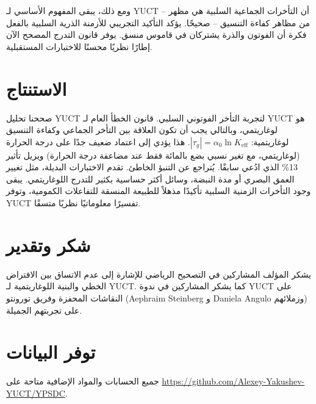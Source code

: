 \documentclass[12pt,a4paper]{article}
\newcommand{\Keff}{K_{\mathrm{eff}}}
\begin{document}
	ومع ذلك، يبقى المفهوم الأساسي لـ YUCT – أن التأخرات الجماعية السلبية هي مظهر من مظاهر كفاءة التنسيق – صحيحًا. يؤكد التأكيد التجريبي للأزمنة الذرية السلبية بالفعل فكرة أن الفوتون والذرة يشتركان في قاموس منسق. يوفر قانون التدرج المصحح الآن إطارًا نظريًا محسنًا للاختبارات المستقبلية.
	
	\section{الاستنتاج}
	
	صححنا تحليل YUCT لتجربة التأخر الفوتوني السلبي. قانون الخطأ العام لـ YUCT هو لوغاريتمي، وبالتالي يجب أن تكون العلاقة بين التأخر الجماعي وكفاءة التنسيق لوغاريتمية: \(|\tau_g| = \alpha_0 \ln\Keff\). هذا يؤدي إلى اعتماد ضعيف جدًا على درجة الحرارة (لوغاريتمي، مع تغير نسبي بضع بالمائة فقط عند مضاعفة درجة الحرارة) ويزيل تأثير 13\% الذي ادُعي سابقًا. يُتراجع عن التنبؤ الخاطئ. تقدم الاختبارات البديلة، مثل تغيير العمق البصري أو مدة النبضة، وسائل أكثر حساسية بكثير للتدرج اللوغاريتمي. يبقى وجود التأخرات الزمنية السلبية تأكيدًا مذهلاً للطبيعة المنسقة للتفاعلات الكمومية، وتوفر YUCT تفسيرًا معلوماتيًا نظريًا متسقًا.
	
	\section*{شكر وتقدير}
	
	يشكر المؤلف المشاركين في التصحيح الرياضي للإشارة إلى عدم الاتساق بين الافتراض الخطي والبنية اللوغاريتمية لـ YUCT. كما يشكر المشاركين في ندوة YUCT على النقاشات المحفزة وفريق تورونتو (Aephraim Steinberg و Daniela Angulo وزملائهم) على تجربتهم الجميلة.
	
	\section*{توفر البيانات}
	
	جميع الحسابات والمواد الإضافية متاحة على \url{https://github.com/Alexey-Yakushev-YUCT/YPSDC}.
	
\end{document}
